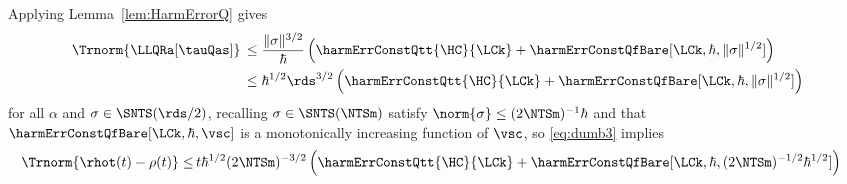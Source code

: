 \documentclass{article}
\numberwithin{equation}{section}
\begin{document}
Applying Lemma~\ref{lem:HarmErrorQ} gives
\begin{align}
    \Trnorm{ \LLQRa [\tauQas]} \,
    &\leq \frac{\|\sigma\|^{3/2}}{\hbar} 
        \left(\harmErrConstQtt{\HC}{\LCk} + \harmErrConstQfBare[\LCk,\hbar,\|\sigma\|^{1/2}] \right)\\
    \,&\leq \hbar^{1/2} \rds^{3/2}
        \left(\harmErrConstQtt{\HC}{\LCk} + \harmErrConstQfBare[\LCk,\hbar,\|\sigma\|^{1/2}] \right)
\end{align}
for all $\alpha$ and $\sigma\in\SNTS(\rds/2)$, recalling $\sigma\in\SNTS(\NTSm)$ satisfy $\norm{\sigma} \leq (2\NTSm)^{-1} \hbar$ and that $\harmErrConstQfBare[\LCk,\hbar,\vsc]$ is a monotonically increasing function of $\vsc$, so \eqref{eq:dumb3} implies
\begin{align}\label{eq:rhot-rho}
	\Trnorm{\rhot(t)-\rho(t)} \le 
    &\,  t \hbar^{1/2} (2\NTSm)^{-3/2} \left( \harmErrConstQtt{\HC}{\LCk} +  \harmErrConstQfBare[\LCk,\hbar, (2\NTSm)^{-1/2}\hbar^{1/2}] \right) 
\end{align}
\end{document}
